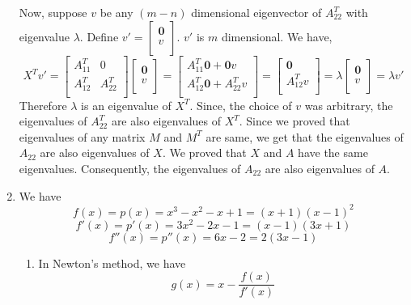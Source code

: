 \documentclass{article}
\begin{document}
\begin{enumerate}
    Now, suppose $v$ be any $(m - n)$ dimensional eigenvector of $A_{22}^T$ with eigenvalue $\lambda$. Define $v' = \begin{bmatrix}
        \mathbf{0}\\
        v\\
    \end{bmatrix}$. $v'$ is $m$ dimensional. We have,
    $$X^Tv' = \begin{bmatrix}
        A_{11}^T & 0\\
        A_{12}^T & A_{22}^T\\
    \end{bmatrix}\begin{bmatrix}
        \mathbf{0}\\
        v\\
    \end{bmatrix} = \begin{bmatrix}
        A_{11}^T\mathbf{0} + \mathbf{0}v\\
        A_{12}^T\mathbf{0} + A_{22}^Tv\\
    \end{bmatrix} = \begin{bmatrix}
        \mathbf{0}\\
        A_{12}^Tv\\
    \end{bmatrix} = \lambda \begin{bmatrix}
        \mathbf{0}\\
        v\\
    \end{bmatrix} = \lambda v'$$
    Therefore $\lambda$ is an eigenvalue of $X^T$. Since, the choice of $v$ was arbitrary, the eigenvalues of $A_{22}^T$ are also eigenvalues of $X^T$. Since we proved that eigenvalues of any matrix $M$ and $M^T$ are same, we get that the eigenvalues of $A_{22}$ are also eigenvalues of $X$. We proved that $X$ and $A$ have the same eigenvalues. Consequently, the eigenvalues of $A_{22}$ are also eigenvalues of $A$.\\
    \item We have
    $$f(x) = p(x) = x^3 - x^2 - x + 1 = (x + 1)(x - 1)^2$$
    $$f'(x) = p'(x) = 3x^2 - 2x - 1 = (x - 1)(3x + 1)$$
    $$f''(x) = p''(x) = 6x - 2 = 2(3x - 1)$$
    \begin{enumerate}[label=(\alph*)]
        \item In Newton's method, we have
        \begin{equation}
        g(x) = x - \frac{f(x)}{f'(x)}
        \label{eq:newton}

\end{equation}
\end{enumerate}
\end{enumerate}
\end{document}
